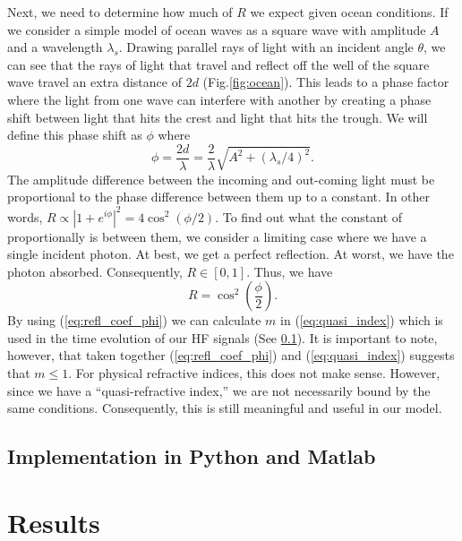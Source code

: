 \documentclass[11pt]{article}
\numberwithin{equation}{section}
\begin{document}
Next, we need to determine how much of $R$ we expect given ocean conditions. If we consider a simple model of ocean waves as a square wave with amplitude $A$ and a wavelength $\lambda_s$. Drawing parallel rays of light with an incident angle $\theta$, we can see that the rays of light that travel and reflect off the well of the square wave travel an extra distance of $2d$ (Fig.\ref{fig:ocean}). This leads to a phase factor where the light from one wave can interfere with another by creating a phase shift between light that hits the crest and light that hits the trough. We will define this phase shift as $\phi$ where 
\begin{equation}
    \phi = \frac{2d}{\lambda} = \frac{2}{\lambda}\sqrt{A^2 + (\lambda_s/4)^2}.
\end{equation}
The amplitude difference between the incoming and out-coming light must be proportional to the phase difference between them up to a constant. In other words, $R \propto |1+e^{i\phi}|^2 = 4 \cos^2(\phi/2)$. To find out what the constant of proportionally is between them, we consider a limiting case where we have a single incident photon. At best, we get a perfect reflection. At worst, we have the photon absorbed. Consequently, $R \in [0,1]$. Thus, we have
\begin{equation}
    R =  \cos^2\left(\frac\phi2\right).
    \label{eq:refl_coef_phi}
\end{equation}
By using (\ref{eq:refl_coef_phi}) we can calculate $m$ in (\ref{eq:quasi_index}) which is used in the time evolution of our HF signals (See \ref{sub:implementation}). It is important to note, however, that taken together (\ref{eq:refl_coef_phi}) and (\ref{eq:quasi_index}) suggests that $m \le 1$. For physical refractive indices, this does not make sense. However, since we have a ``quasi-refractive index,'' we are not necessarily bound by the same conditions. Consequently, this is still meaningful and useful in our model.




\subsection{Implementation in Python and Matlab}
\label{sub:implementation}


\section{Results} %
\label{sec:results}
\end{document}
